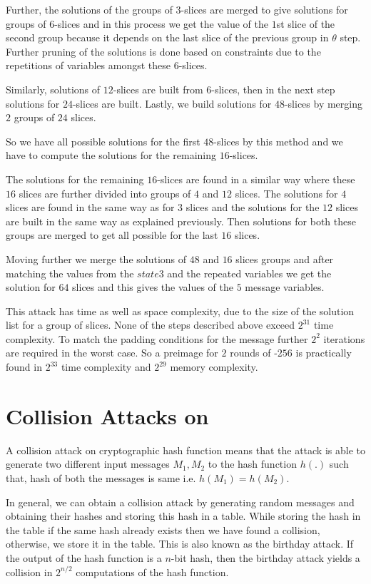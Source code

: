 Further, the solutions of the groups of $3$-slices are merged to give solutions for groups of $6$-slices and in this process we get the value of the $1$st slice of the second group because it depends on the last slice of the previous group in $\theta$ step. Further pruning of the solutions is done based on constraints due to the repetitions of variables amongst these $6$-slices.

Similarly, solutions of $12$-slices are built from $6$-slices, then in the next step solutions for $24$-slices are built. Lastly, we build solutions for $48$-slices by merging $2$ groups of $24$ slices.
 
So we have all possible solutions for the first $48$-slices by this method and we have to compute the solutions for the remaining $16$-slices.

The solutions for the remaining $16$-slices are found in a similar way where these $16$ slices are further divided into groups of $4$ and $12$ slices. The solutions for $4$ slices are found in the same way as for $3$ slices and the solutions for the $12$ slices are built in the same way as explained previously. Then solutions for both these groups are merged to get all possible for the last $16$ slices.

Moving further we merge the solutions of $48$ and $16$ slices groups and after matching the values from the $state3$ and the repeated variables we get the solution for $64$ slices and this gives the values of the $5$ message variables.

This attack has time as well as space complexity, due to the size of the solution list for a group of slices. None of the steps described above exceed $2^{31}$ time complexity. To match the padding conditions for the message further $2^2$ iterations are required in the worst case. So a preimage for $2$ rounds of \KECCAK-$256$ is practically found in $2^{33}$ time complexity and $2^{29}$ memory complexity.

\section{Collision Attacks on \KECCAK{}}

A collision attack on cryptographic hash function means that the attack is able to generate two different input messages $M_1, M_2$ to the hash function $h(.)$ such that, hash of both the messages is same i.e. $h(M_1) = h(M_2)$.

In general, we can obtain a collision attack by generating random messages and obtaining their hashes and storing this hash in a table. While storing the hash in the table if the same hash already exists then we have found a collision, otherwise, we store it in the table. This is also known as the birthday attack. If the output of the hash function is a $n$-bit hash, then the birthday attack yields a collision in $2^{n/2}$ computations of the hash function.

